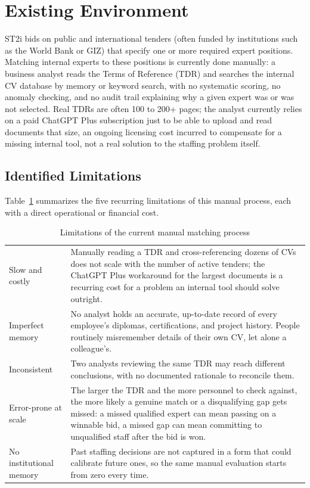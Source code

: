 \section{Existing Environment}

ST2i bids on public and international tenders (often funded by institutions
such as the World Bank or GIZ) that specify one or more required expert
positions. Matching internal experts to these positions is currently done
manually: a business analyst reads the Terms of Reference (TDR) and searches
the internal CV database by memory or keyword search, with no systematic
scoring, no anomaly checking, and no audit trail explaining why a given
expert was or was not selected. Real TDRs are often 100 to 200+ pages; the
analyst currently relies on a paid ChatGPT Plus subscription just to be able
to upload and read documents that size, an ongoing licensing cost incurred
to compensate for a missing internal tool, not a real solution to the
staffing problem itself.

\subsection{Identified Limitations}

Table~\ref{tab:limitations} summarizes the five recurring limitations of
this manual process, each with a direct operational or financial cost.

\begin{table}[H]
  \centering
  \caption{Limitations of the current manual matching process}
  \label{tab:limitations}
  \begin{tabular}{@{}p{3.4cm}p{14.3cm}@{}}
    \toprule
    Slow and costly & Manually reading a TDR and cross-referencing dozens of CVs does not scale with the number of active tenders; the ChatGPT Plus workaround for the largest documents is a recurring cost for a problem an internal tool should solve outright. \\
    Imperfect memory & No analyst holds an accurate, up-to-date record of every employee's diplomas, certifications, and project history. People routinely misremember details of their own CV, let alone a colleague's. \\
    Inconsistent & Two analysts reviewing the same TDR may reach different conclusions, with no documented rationale to reconcile them. \\
    Error-prone at scale & The larger the TDR and the more personnel to check against, the more likely a genuine match or a disqualifying gap gets missed: a missed qualified expert can mean passing on a winnable bid, a missed gap can mean committing to unqualified staff after the bid is won. \\
    No institutional memory & Past staffing decisions are not captured in a form that could calibrate future ones, so the same manual evaluation starts from zero every time. \\
    \bottomrule
  \end{tabular}
\end{table}

